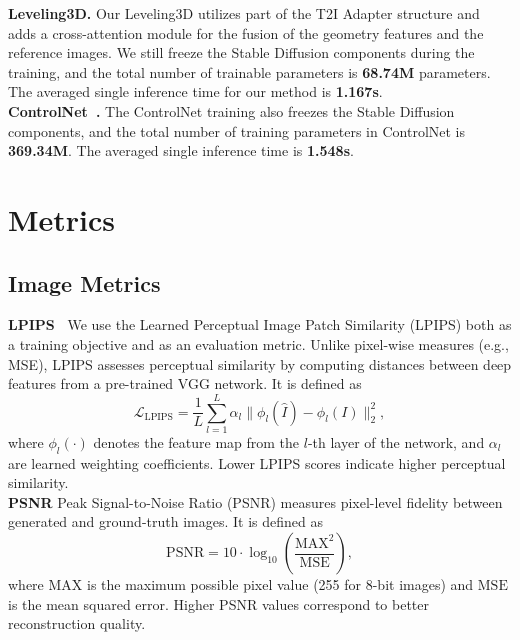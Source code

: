 \noindent\textbf{Leveling3D.}
Our Leveling3D utilizes part of the T2I Adapter structure and adds a cross-attention module for the fusion of the geometry features and the reference images. We still freeze the Stable Diffusion components during the training, and the total number of trainable parameters is \textbf{68.74M} parameters. The averaged single inference time for our method is \textbf{1.167s}.
\\

\noindent\textbf{ControlNet~\cite{zhang2023ControlNet}.}
The ControlNet training also freezes the Stable Diffusion components, and the total number of training parameters in ControlNet is \textbf{369.34M}. The averaged single inference time is \textbf{1.548s}.

\section{Metrics}
\subsection{Image Metrics}

\noindent\textbf{LPIPS~\cite{johnson2016perceptual}}
We use the Learned Perceptual Image Patch Similarity (LPIPS) both as a training objective and as an evaluation metric. 
Unlike pixel-wise measures (e.g., MSE), LPIPS assesses perceptual similarity by computing distances between deep features from a pre-trained VGG network. 
It is defined as
\begin{equation}
\mathcal{L}_{\text{LPIPS}} = \frac{1}{L} \sum_{l=1}^{L} \alpha_l \Big\| \phi_l(\hat{I}) - \phi_l(I) \Big\|_2^2,
\end{equation}
where \(\phi_l(\cdot)\) denotes the feature map from the \(l\)-th layer of the network, and \(\alpha_l\) are learned weighting coefficients. 
Lower LPIPS scores indicate higher perceptual similarity.
\\

\noindent\textbf{PSNR}
Peak Signal-to-Noise Ratio (PSNR) measures pixel-level fidelity between generated and ground-truth images. 
It is defined as
\begin{equation}
\text{PSNR} = 10 \cdot \log_{10} \left( \frac{\text{MAX}^2}{\text{MSE}} \right),
\end{equation}
where \(\text{MAX}\) is the maximum possible pixel value (255 for 8-bit images) and \(\text{MSE}\) is the mean squared error. 
Higher PSNR values correspond to better reconstruction quality.
\\

